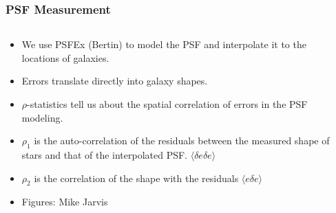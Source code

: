 \documentclass{beamer}
\begin{document}
\frame
{
    \frametitle{PSF Measurement}

    \fontsize{9}{0.8\baselineskip}

    \begin{columns}
        \begin{column}{0.45\textwidth}
            \begin{itemize}

                \item We use PSFEx (Bertin) to model the PSF and interpolate it to
                    the locations of galaxies.

                \item Errors translate directly into galaxy shapes.

                \item $\rho$-statistics tell us about the spatial correlation 
                    of errors in the PSF modeling.

                \item $\rho_1$ is the auto-correlation of the residuals between
                    the measured shape of stars and that of the interpolated PSF.
                    $\langle \delta e \delta e\rangle$
                \item $\rho_2$ is the correlation of the shape with the residuals
                    $\langle e \delta e\rangle$

                \item Figures: Mike Jarvis

            \end{itemize}
        \end{column}
        \begin{column}{0.55\textwidth}


\end{column}
\end{columns}}
\end{document}
